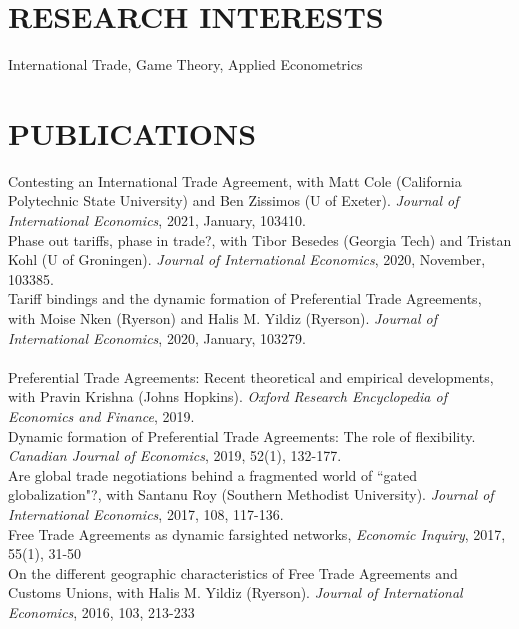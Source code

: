\documentclass[11pt]{res}
\begin{document}
\begin{resume}
\section{RESEARCH INTERESTS}\vspace{1.5mm}
International Trade, Game Theory, Applied Econometrics

\section{PUBLICATIONS}\vspace{1.5mm}
{Contesting an International Trade Agreement}, with Matt Cole (California Polytechnic State University) and Ben Zissimos (U of Exeter). \emph{Journal of International Economics}, 2021, January, 103410.\vspace{1.5mm}\\
{Phase out tariffs, phase in trade?}, with Tibor Besedes (Georgia Tech) and Tristan Kohl (U of Groningen). \emph{Journal of International Economics}, 2020, November, 103385.\vspace{1.5mm}\\
{Tariff bindings and the dynamic formation of Preferential Trade Agreements}, with Moise Nken (Ryerson) and Halis M. Yildiz (Ryerson). \emph{Journal of International Economics}, 2020, January, 103279.\vspace{1.5mm}\\
\\
{Preferential Trade Agreements: Recent theoretical and empirical developments}, with Pravin Krishna (Johns Hopkins). \emph{Oxford Research Encyclopedia of Economics and Finance}, 2019.\vspace{1.5mm}\\
{Dynamic formation of Preferential Trade Agreements: The role of flexibility}. \emph{Canadian Journal of Economics}, 2019, 52(1), 132-177. \vspace{1.5mm}\\
{Are global trade negotiations behind a fragmented world of ``gated globalization"?}, with Santanu Roy (Southern Methodist University). \emph{Journal of International Economics}, 2017, 108, 117-136.\vspace{1.5mm}\\
{ Free Trade Agreements as dynamic farsighted networks}, \emph{Economic Inquiry}, 2017, 55(1), 31-50\vspace{1.5mm}\\
{On the different geographic characteristics of Free Trade Agreements and Customs Unions}, with Halis M. Yildiz (Ryerson). \emph{Journal of International Economics}, 2016, 103, 213-233 \vspace{1.5mm}\\

\end{resume}
\end{document}
